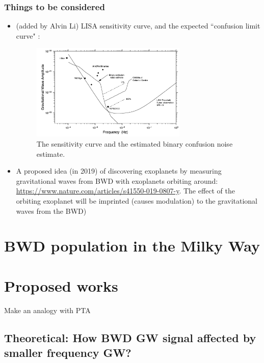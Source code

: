 \documentclass{article}
\begin{document}
\subsubsection*{Things to be considered}

\begin{itemize}
    \item (added by Alvin Li) LISA sensitivity curve, and the expected ``confusion limit curve" :
    
    \begin{figure}[h!]
        \centering
        \includegraphics[width=0.7\textwidth]{LISA_sensitivity_curve.png}
        \caption{\label{fig:LISA_sensitivity} The sensitivity curve and the estimated binary confusion noise estimate.}
    \end{figure}
    
    \item A proposed idea (in 2019) of discovering exoplanets by measuring gravitational waves from BWD with exoplanets orbiting around: \url{ https://www.nature.com/articles/s41550-019-0807-y}. The effect of the orbiting exoplanet will be imprinted (causes modulation) to the gravitational waves from the BWD)

\end{itemize}

\section{BWD population in the Milky Way}


\section{Proposed works}

Make an analogy with PTA \cite{Moore2015}

\subsection{\label{theoretical}Theoretical: How BWD GW signal affected by smaller frequency GW?}
\end{document}
